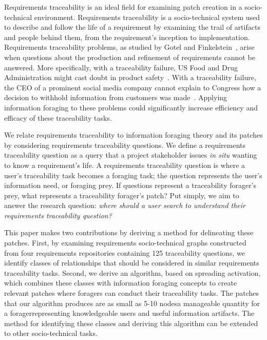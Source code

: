 Requirements traceability is an ideal field for examining patch creation in a socio-technical environment. Requirements traceability is a socio-technical system used to describe and follow the life of a requirement by examining the trail of artifacts and people behind them, from the requirement's inception to implementation. Requirements traceability problems, as studied by Gotel and Finkelstein~\cite{ICSE30}, arise when questions about the production and refinement of requirements cannot be answered. More specifically, with a traceability failure, US Food and Drug Administration might cast doubt in product safety~\cite{ICSE46}. With a traceability failure, the CEO of a prominent social media company cannot explain to Congress how a decision to withhold information from customers was made~\cite{politicoFacebook}. Applying information foraging to these problems could significantly increase efficiency and efficacy of these traceability tasks.

We relate requirements traceability to information foraging theory and its patches by considering requirements traceability questions. We define a requirements traceability question as a query that a project stakeholder issues \textit{in situ} wanting to know a requirement's life. A requirements traceability question is where a user's traceability task becomes a foraging task; the question represents the user's information need, or foraging prey. If questions represent a traceability forager's prey, what represents a traceability forager's patch? Put simply, we aim to answer the research question: \textit{where should a user search to understand their requirements traceability question?}

This paper makes two contributions by deriving a method for delineating these patches. First, by examining requirements socio-technical graphs constructed from four requirements repositories containing 125 traceability questions, we identify classes of relationships that should be considered in similar requirements traceability tasks. Second, we derive an algorithm, based on spreading activation, which combines these classes with information foraging concepts to create relevant patches where foragers can conduct their traceability tasks. The patches that our algorithm produces are as small as 5-10 nodes\textemdash a manageable quantity for a forager\textemdash representing knowledgeable users and useful information artifacts. The method for identifying these classes and deriving this algorithm can be extended to other socio-technical tasks.